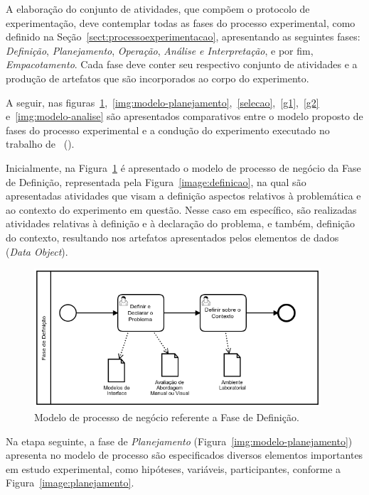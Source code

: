 A elaboração do conjunto de atividades, que compõem o protocolo de experimentação, deve contemplar todas as fases do processo experimental, como definido na Seção~\ref{sect:processoexperimentacao}, apresentando as seguintes fases: \textit{Definição}, \textit{Planejamento}, \textit{Operação}, \textit{Análise e Interpretação}, e por fim, \textit{Empacotamento}. Cada fase deve conter seu respectivo conjunto de atividades e a produção de artefatos que são incorporados ao corpo do experimento.

A seguir, nas figuras~\ref{img:modelo-definicao},~\ref{img:modelo-planejamento},~\ref{selecao},~\ref{g1},~\ref{g2} e~\ref{img:modelo-analise} são apresentados comparativos entre o modelo proposto de fases do processo experimental e a condução do experimento executado no trabalho de~ (\citeyear{martins2017modeluiviz}).


Inicialmente, na Figura~\ref{img:modelo-definicao} é apresentado o modelo de processo de negócio da Fase de Definição, representada pela Figura~\ref{image:definicao}, na qual são apresentadas atividades que visam a definição aspectos relativos à problemática e ao contexto do experimento em questão. Nesse caso em específico, são realizadas atividades relativas à definição e à declaração do problema, e também, definição do contexto, resultando nos artefatos apresentados pelos elementos de dados (\textit{Data Object}).

\begin{figure}[!ht]
\centering
\includegraphics[width=0.95\textwidth]{images/modelo-definicao.png}
\caption{Modelo de processo de negócio referente a Fase de Definição.}
\label{img:modelo-definicao}
\end{figure}

Na etapa seguinte, a fase de \textit{Planejamento} (Figura~\ref{img:modelo-planejamento}) apresenta no modelo de processo são especificados diversos elementos importantes em estudo experimental, como hipóteses, variáveis, participantes, conforme a Figura~\ref{image:planejamento}. 

